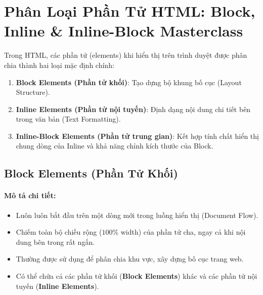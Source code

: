 \documentclass[11pt,oneside]{book}
\newcommand{\term}[1]{\textbf{\textcolor{primaryBlue}{#1}}}
\begin{document}
\section{Phân Loại Phần Tử HTML: Block, Inline \& Inline-Block Masterclass}
\label{sec:html_block_inline_masterclass}

Trong HTML, các phần tử (elements) khi hiển thị trên trình duyệt được phân chia thành hai loại mặc định chính:
\begin{enumerate}[leftmargin=1.8em, itemsep=3pt, parsep=0pt]
    \item \textbf{Block Elements (Phần tử khối)}: Tạo dựng bộ khung bố cục (Layout Structure).
    \item \textbf{Inline Elements (Phần tử nội tuyến)}: Định dạng nội dung chi tiết bên trong văn bản (Text Formatting).
    \item \textbf{Inline-Block Elements (Phần tử trung gian)}: Kết hợp tính chất hiển thị chung dòng của Inline và khả năng chỉnh kích thước của Block.
\end{enumerate}

\subsection{Block Elements (Phần Tử Khối)}

\paragraph{Mô tả chi tiết:}
\begin{itemize}[leftmargin=1.8em, itemsep=3pt, parsep=0pt]
    \item Luôn luôn bắt đầu trên một dòng mới trong luồng hiển thị (Document Flow).
    \item Chiếm toàn bộ chiều rộng ($100\%$ width) của phần tử cha, ngay cả khi nội dung bên trong rất ngắn.
    \item Thường được sử dụng để phân chia khu vực, xây dựng bố cục trang web.
    \item Có thể chứa cả các phần tử khối (\term{Block Elements}) khác và các phần tử nội tuyến (\term{Inline Elements}).
\end{itemize}
\end{document}

